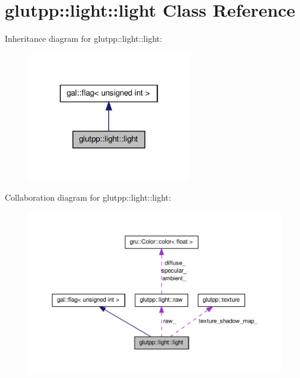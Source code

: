 \hypertarget{classglutpp_1_1light_1_1light}{\section{glutpp\-:\-:light\-:\-:light \-Class \-Reference}
\label{classglutpp_1_1light_1_1light}
}


\-Inheritance diagram for glutpp\-:\-:light\-:\-:light\-:\nopagebreak
\begin{figure}[H]
\begin{center}
\leavevmode
\includegraphics[width=202pt]{classglutpp_1_1light_1_1light__inherit__graph}
\end{center}
\end{figure}


\-Collaboration diagram for glutpp\-:\-:light\-:\-:light\-:\nopagebreak
\begin{figure}[H]
\begin{center}
\leavevmode
\includegraphics[width=350pt]{classglutpp_1_1light_1_1light__coll__graph}
\end{center}
\end{figure}
